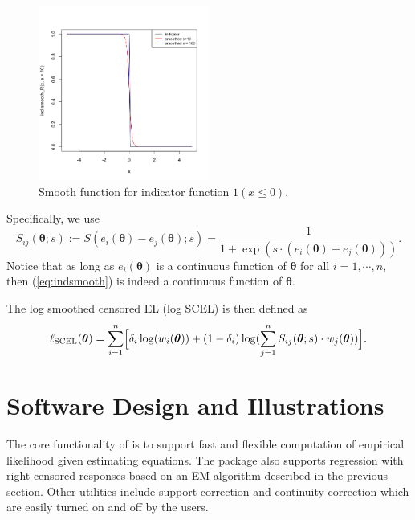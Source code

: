 \documentclass[article]{jss}
\renewcommand{\|}{\,|\,}
\begin{document}
\begin{figure}[hbt!]
\centering
\includegraphics[width=0.5\textwidth]{smoothfun}
\caption{Smooth function for indicator function $\mathfrak 1(x\leq 0)$.}
\label{fig:smoothfun}
\end{figure}

Specifically, we use
\begin{equation}\label{eq:indsmooth}
  S_{ij}(\bm \theta;s) := S(e_i(\bm \theta)-e_j(\bm \theta);s)
  = \frac{1}{1+\exp(s\cdot(e_i(\bm \theta)-e_j(\bm \theta)))}.
\end{equation}
Notice that as long as \(e_i(\bm \theta)\) is a continuous function of \(\bm \theta\) for all \(i=1,\cdots,n\), then (\ref{eq:indsmooth}) is indeed a continuous function of \(\bm \theta\).

The log smoothed censored EL (log SCEL) is then defined as
\begin{equation}\label{eq:logel_smoo}
  \ell_{\textrm{SCEL}}(\bm \theta) = \sum_{i=1}^n \Bigl[\delta_i\log(w_i(\bm \theta)) +
    (1-\delta_i)\log(\sum_{j=1}^n S_{ij}(\bm \theta;s)\cdot w_j(\bm \theta))\Bigr].
\end{equation}

\hypertarget{software-design-and-illustrations}{%
\section{Software Design and Illustrations}\label{software-design-and-illustrations}}

The core functionality of  is to support fast and flexible computation of empirical likelihood given estimating equations. The package also supports regression with right-censored responses based on an EM algorithm described in the previous section. Other utilities include support correction and continuity correction which are easily turned on and off by the users.
\end{document}
